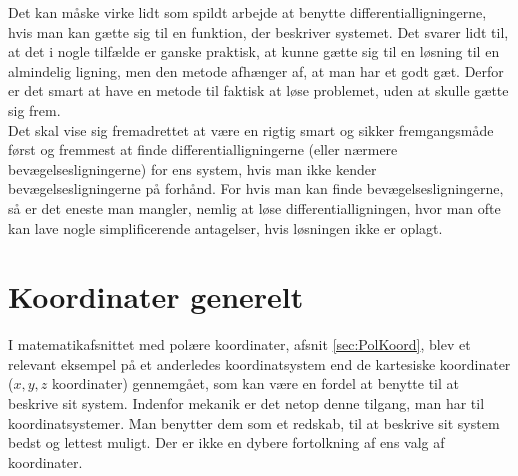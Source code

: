 %
Det kan måske virke lidt som spildt arbejde at benytte differentialligningerne, hvis man kan gætte sig til en funktion, der beskriver systemet. Det svarer lidt til, at det i nogle tilfælde er ganske praktisk, at kunne gætte sig til en løsning til en almindelig ligning, men den metode afhænger af, at man har et godt gæt. Derfor er det smart at have en metode til faktisk at løse problemet, uden at skulle gætte sig frem. \\

Det skal vise sig fremadrettet at være en rigtig smart og sikker fremgangsmåde først og fremmest at finde differentialligningerne (eller nærmere bevægelsesligningerne) for ens system, hvis man ikke kender bevægelsesligningerne på forhånd. For hvis man kan finde bevægelsesligningerne, så er det eneste man mangler, nemlig at løse differentialligningen, hvor man ofte kan lave nogle simplificerende antagelser, hvis løsningen ikke er oplagt.

\section{Koordinater generelt}
I matematikafsnittet med polære koordinater, afsnit \ref{sec:PolKoord}, blev et relevant eksempel på et anderledes koordinatsystem end de kartesiske koordinater ($x,y,z$ koordinater) gennemgået, som kan være en fordel at benytte til at beskrive sit system. Indenfor mekanik er det netop denne tilgang, man har til koordinatsystemer. Man benytter dem som et redskab, til at beskrive sit system bedst og lettest muligt. Der er ikke en dybere fortolkning af ens valg af koordinater. \\

